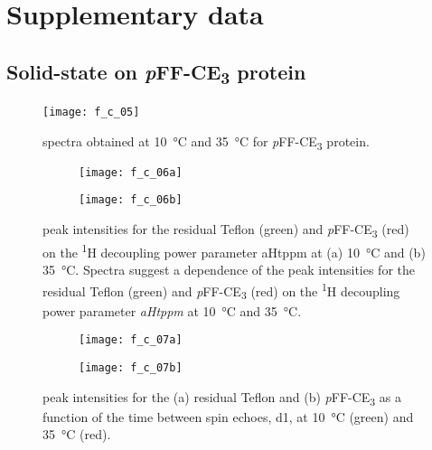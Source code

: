 \chapter{Supplementary data}

\section{Solid-state  on \emph{p}FF-CE\textsubscript{3} protein}
\begin{figure}[h!] \centering \texttt{[image: f\_c\_05]}
    \caption{ spectra obtained at \SI{10}{\celsius} and
    \SI{35}{\celsius} for \emph{p}FF-CE\textsubscript{3} protein.}
    \label{fig:nmr_result_1} \end{figure}
\begin{figure}
    \centering
    \begin{subfigure}[b]{0.4\textwidth}
        \texttt{[image: f\_c\_06a]}
    \end{subfigure}
    \begin{subfigure}[b]{0.4\textwidth}
        \texttt{[image: f\_c\_06b]}
    \end{subfigure}
    \caption{ peak intensities for the residual Teflon (green) and
    \emph{p}FF-CE\textsubscript{3} (red) on the \textsuperscript{1}H decoupling
    power parameter aHtppm at (a) \SI{10}{\celsius} and (b)
    \SI{35}{\celsius}.  Spectra suggest a dependence of the peak intensities for
    the residual Teflon (green) and \emph{p}FF-CE\textsubscript{3} (red) on the
    \textsuperscript{1}H decoupling power parameter \emph{aHtppm} at
    \SI{10}{\celsius} and \SI{35}{\celsius}.}\label{fig:nmr_result_2}
\end{figure}
\begin{figure}
    \centering
    \begin{subfigure}[b]{0.4\textwidth}
        \texttt{[image: f\_c\_07a]}
    \end{subfigure}
    \begin{subfigure}[b]{0.4\textwidth}
        \texttt{[image: f\_c\_07b]}
    \end{subfigure}
    \caption{ peak intensities for the (a) residual Teflon and (b)
    \emph{p}FF-CE\textsubscript{3} as a function of the time between spin
    echoes, d1, at \SI{10}{\celsius} (green) and \SI{35}{\celsius} (red).}
    \label{fig:nmr_result_3}
\end{figure}
